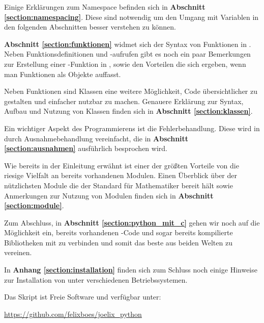 Einige Erklärungen zum Namespace befinden sich in \textbf{Abschnitt \ref{section:namespacing}}. Diese sind notwendig um den Umgang 
mit Variablen in den folgenden Abschnitten besser verstehen zu können.

\textbf{Abschnitt \ref{section:funktionen}} widmet sich der Syntax von Funktionen in \Python. Neben Funktionsdefinitionen und -aufrufen 
gibt es noch ein paar Bemerkungen zur Erstellung einer -Funktion in \Python, sowie den Vorteilen die sich ergeben, wenn 
man Funktionen als Objekte auffasst.

Neben Funktionen sind Klassen eine weitere Möglichkeit, Code übersichtlicher zu gestalten und einfacher nutzbar zu machen. Genauere 
Erklärung zur Syntax, Aufbau und Nutzung von Klassen finden sich in \textbf{Abschnitt \ref{section:klassen}}.  

Ein wichtiger Aspekt des Programmierens ist die Fehlerbehandlung. Diese wird in \Python durch Ausnahmebehandlung vereinfacht, die in 
\textbf{Abschnitt \ref{section:ausnahmen}} ausführlich besprochen wird.

Wie bereits in der Einleitung erwähnt ist einer der größten Vorteile von \Python die riesige Vielfalt an bereits vorhandenen Modulen.
Einen Überblick über der nützlichsten Module die der \Python Standard für Mathematiker bereit hält sowie Anmerkungen zur Nutzung von Modulen 
finden sich in \textbf{Abschnitt \ref{section:module}}.

Zum Abschluss, in \textbf{Abschnitt \ref{section:python_mit_c}} gehen wir noch auf die Möglichkeit ein, bereits vorhandenen 
\CC-Code und sogar bereits kompilierte Bibliotheken mit \Python zu verbinden und somit das beste aus beiden Welten zu vereinen.

In \textbf{Anhang \ref{section:installation}} finden sich zum Schluss noch einige Hinweise zur Installation von 
\Python unter verschiedenen Betriebssystemen.

Das Skript ist Freie Software und verfügbar unter:
\begin{center}
  \url{https://github.com/felixboes/joelix_python}
\end{center}
